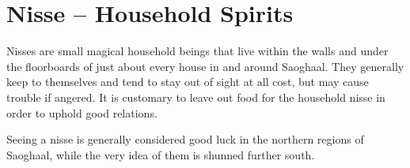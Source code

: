 \section{Nisse -- Household Spirits}
Nisses are small magical household beings that live within the walls and under the floorboards of just about every house in and around Saoghaal.
They generally keep to themselves and tend to stay out of sight at all cost, but may cause trouble if angered.
It is customary to leave out food for the household nisse in order to uphold good relations.

Seeing a nisse is generally considered good luck in the northern regions of Saoghaal, while the very idea of them is shunned further south.